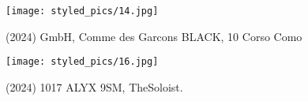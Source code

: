 \begin{minipage}[h!]{0.5\textwidth}
    \begin{figure}[H]\centering
        \texttt{[image: styled\_pics/14.jpg]}
        \caption*{(2024) GmbH, Comme des Garcons BLACK, 10 Corso Como}
    \end{figure}
\end{minipage}
\begin{minipage}[h!]{0.5\textwidth}
    \begin{figure}[H]\centering
        \texttt{[image: styled\_pics/16.jpg]}
        \caption*{(2024) 1017 ALYX 9SM, TheSoloist.}
    \end{figure}
\end{minipage}